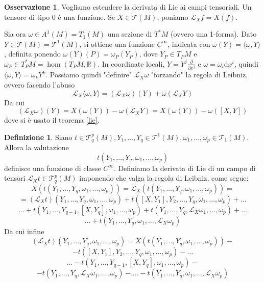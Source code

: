 \documentclass[a4paper,11pt]{article}
\theoremstyle{definition}
\newtheorem{osservazione}{Osservazione}[section]
\newtheorem{definizione}{Definizione}[section]
\theoremstyle{theorem}
\newcommand{\lie}[2]{\mathcal{L}_{#1}#2}
\newcommand{\dif}{\mathrm{d}}
\newcommand{\R}{\mathbb{R}}
\newcommand{\T}{\mathcal{T}}
\begin{document}
\begin{osservazione}
	Vogliamo estendere la derivata di Lie ai campi tensoriali. Un tensore di tipo 0 è una funzione. Se $X\in\mathcal{T}(M)$, poniamo $\lie{X}{f}=X(f)$. 
	
	Sia ora $\omega\in A^1(M)=T_1(M)$ una sezione di $T^*M$ (ovvero una 1-forma). Dato $Y\in\mathcal{T}(M)=\mathcal{T}^1(M)$, si ottiene una funzione $C^\infty$, indicata con $\omega(Y)=\langle\omega,Y\rangle$, definita ponendo $\omega(Y)(P)=\omega_P(Y_P)$, dove $Y_P\in T_PM$ e $\omega_P\in T^*_PM=\hom(T_PM,\R)$. In coordinate locali, $Y=Y^j\frac{\partial}{\partial x^j}$ e $\omega=\omega_i\dif x^i$, quindi $\langle\omega,Y\rangle=\omega_kY^k$.
	Possiamo quindi "definire" $\lie{X}{\omega}$ "forzando" la regola di Leibniz, ovvero facendo l'abuso \[\lie{X}{\langle\omega,Y\rangle}=(\lie{X}{\omega})(Y)+\omega\left(\lie{X}{Y}\right)\]
	Da cui
	\[(\lie{X}{\omega})(Y)=X(\omega(Y))-\omega\left(\lie{X}{Y}\right)=X(\omega(Y))-\omega([X,Y])\]
	dove si è usato il teorema \ref{lie}.
\end{osservazione}
\begin{definizione}
	Siano $t\in\mathcal{T}^p_q(M),Y_1,\dots,Y_q\in\T^1(M),\omega_1,\dots,\omega_p\in\T_1(M)$. Allora la valutazione
	\[t(Y_1,\dots,Y_q,\omega_1,\dots,\omega_p)\]
	definisce una funzione di classe $C^\infty$. Definiamo la derivata di Lie di un campo di tensori $\lie{X}{t}\in\T^p_q(M)$ imponendo che valga la regola di Leibniz, come segue:
	\[X(t(Y_1,\dots,Y_q,\omega_1,\dots,\omega_p))=\lie{X}{\left(t(Y_1,\dots,Y_q,\omega_1,\dots,\omega_p)\right)}=\]\[=\left(\lie{X}{t}\right)\left(Y_1,\dots,Y_q,\omega_1,\dots,\omega_p\right)+t([X,Y_1],Y_2,\dots,Y_q,\omega_1,\dots,\omega_p)+\dots\]\[\dots+t(Y_1,\dots,Y_{q-1},[X,Y_q],\omega_1,\dots,\omega_p)+t(Y_1,\dots,Y_q,\lie{X}{\omega_1},\dots,\omega_p)+\dots\]
	\[\dots+t(Y_1,\dots,Y_q,\omega_1,\dots,\lie{X}{\omega_p})\]
	Da cui infine
	\[\left(\lie{X}{t}\right)\left(Y_1,\dots,Y_q,\omega_1,\dots,\omega_p\right)=X(t(Y_1,\dots,Y_q,\omega_1,\dots,\omega_p))-\]\[-t([X,Y_1],Y_2,\dots,Y_q,\omega_1,\dots,\omega_p)-\dots\]\[\dots-t(Y_1,\dots,Y_{q-1},[X,Y_q],\omega_1,\dots,\omega_p)-\]\[-t(Y_1,\dots,Y_q,\lie{X}{\omega_1},\dots,\omega_p)-\dots-t(Y_1,\dots,Y_q,\omega_1,\dots,\lie{X}{\omega_p})\]
\end{definizione}
\newpage
\end{document}
